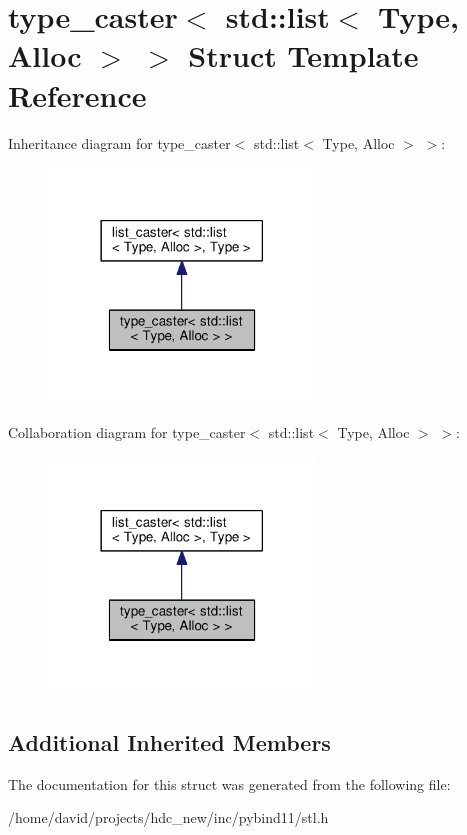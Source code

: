 \hypertarget{structtype__caster_3_01std_1_1list_3_01_type_00_01_alloc_01_4_01_4}{}\section{type\+\_\+caster$<$ std\+:\+:list$<$ Type, Alloc $>$ $>$ Struct Template Reference}
\label{structtype__caster_3_01std_1_1list_3_01_type_00_01_alloc_01_4_01_4}


Inheritance diagram for type\+\_\+caster$<$ std\+:\+:list$<$ Type, Alloc $>$ $>$\+:
\nopagebreak
\begin{figure}[H]
\begin{center}
\leavevmode
\includegraphics[width=201pt]{structtype__caster_3_01std_1_1list_3_01_type_00_01_alloc_01_4_01_4__inherit__graph}
\end{center}
\end{figure}


Collaboration diagram for type\+\_\+caster$<$ std\+:\+:list$<$ Type, Alloc $>$ $>$\+:
\nopagebreak
\begin{figure}[H]
\begin{center}
\leavevmode
\includegraphics[width=201pt]{structtype__caster_3_01std_1_1list_3_01_type_00_01_alloc_01_4_01_4__coll__graph}
\end{center}
\end{figure}
\subsection*{Additional Inherited Members}


The documentation for this struct was generated from the following file\+:\begin{DoxyCompactItemize}
\item 
/home/david/projects/hdc\+\_\+new/inc/pybind11/stl.\+h\end{DoxyCompactItemize}
